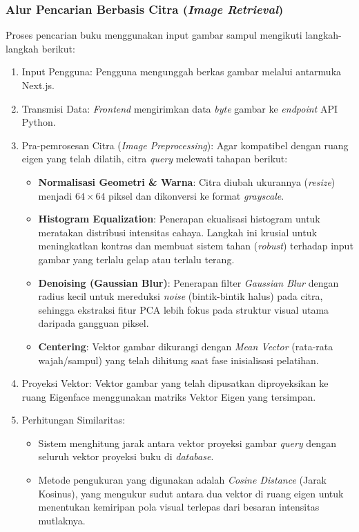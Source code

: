 \documentclass[12pt,a4paper]{article}
\begin{document}
\subsubsection{Alur Pencarian Berbasis Citra (\textit{Image Retrieval})}
Proses pencarian buku menggunakan input gambar sampul mengikuti langkah-langkah berikut:
\begin{enumerate}
    \item Input Pengguna: Pengguna mengunggah berkas gambar melalui antarmuka Next.js.
    \item Transmisi Data: \textit{Frontend} mengirimkan data \textit{byte} gambar ke \textit{endpoint} API Python.
    \item Pra-pemrosesan Citra (\textit{Image Preprocessing}):
    Agar kompatibel dengan ruang eigen yang telah dilatih, citra \textit{query} melewati tahapan berikut:
    \begin{itemize}
        \item \textbf{Normalisasi Geometri \& Warna}: Citra diubah ukurannya (\textit{resize}) menjadi $64 \times 64$ piksel dan dikonversi ke format \textit{grayscale}.
        \item \textbf{Histogram Equalization}: Penerapan ekualisasi histogram untuk meratakan distribusi intensitas cahaya. Langkah ini krusial untuk meningkatkan kontras dan membuat sistem tahan (\textit{robust}) terhadap input gambar yang terlalu gelap atau terlalu terang.
        \item \textbf{Denoising (Gaussian Blur)}: Penerapan filter \textit{Gaussian Blur} dengan radius kecil untuk mereduksi \textit{noise} (bintik-bintik halus) pada citra, sehingga ekstraksi fitur PCA lebih fokus pada struktur visual utama daripada gangguan piksel.
        \item \textbf{Centering}: Vektor gambar dikurangi dengan \textit{Mean Vector} (rata-rata wajah/sampul) yang telah dihitung saat fase inisialisasi pelatihan.
    \end{itemize}
    \item Proyeksi Vektor: Vektor gambar yang telah dipusatkan diproyeksikan ke ruang Eigenface menggunakan matriks Vektor Eigen yang tersimpan.
    \item Perhitungan Similaritas:
    \begin{itemize}
        \item Sistem menghitung jarak antara vektor proyeksi gambar \textit{query} dengan seluruh vektor proyeksi buku di \textit{database}.
        \item Metode pengukuran yang digunakan adalah \textit{Cosine Distance} (Jarak Kosinus), yang mengukur sudut antara dua vektor di ruang eigen untuk menentukan kemiripan pola visual terlepas dari besaran intensitas mutlaknya.

\end{itemize}
\end{enumerate}
\end{document}
